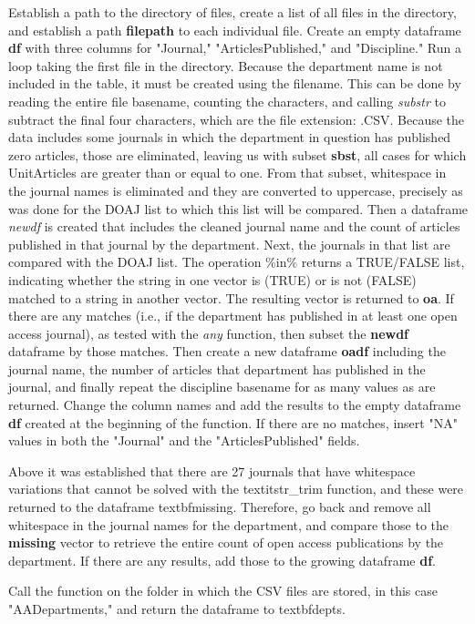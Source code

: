\documentclass{article}
\begin{document}
\footnotesize{
		Establish a path to the directory of files, create a list of all files in the directory, and establish a path \textbf{filepath} to each individual file.
		Create an empty dataframe \textbf{df} with three columns for "Journal," "ArticlesPublished," and "Discipline."
		Run a loop taking the first file in the directory.
		Because the department name is not included in the table, it must be created using the filename.
		This can be done by reading the entire file basename, counting the characters, and calling \textit{substr} to subtract the final four characters, which are the file extension: .CSV.
		Because the data includes some journals in which the department in question has published zero articles, those are eliminated, leaving us with subset \textbf{sbst}, all cases for which UnitArticles are greater than or equal to one.
		From that subset, whitespace in the journal names is eliminated and they are converted to uppercase, precisely as was done for the DOAJ list to which this list will be compared.
		Then a dataframe \textit{newdf} is created that includes the cleaned journal name and the count of articles published in that journal by the department.
		Next, the journals in that list are compared with the DOAJ list. 
		The operation \%in\%  returns a TRUE/FALSE list, indicating whether the string in one vector is (TRUE) or is not (FALSE) matched to a string in another vector. 
		The resulting vector is returned to \textbf{oa}.
		If there are any matches (i.e., if the department has published in at least one open access journal), as tested with the \textit{any} function, then subset the \textbf{newdf} dataframe by those matches.
		Then create a new dataframe \textbf{oadf} including the journal name, the number of articles that department has published in the journal, and finally repeat the discipline basename for as many values as are returned.
		Change the column names and add the results to the empty dataframe \textbf{df} created at the beginning of the function.
		If there are no matches, insert "NA" values in both the "Journal"  and the "ArticlesPublished" fields.
		
		Above it was established that there are 27 journals that have whitespace variations that cannot be solved with the textit{str\_trim} function, and these were returned to the dataframe textbf{missing}.
		Therefore, go back and remove all whitespace in the journal names for the department, and compare those to the \textbf{missing} vector to retrieve the entire count of open access publications by the department.
		If there are any results, add those to the growing dataframe \textbf{df}. 
		
		Call the function on the folder in which the CSV files are stored, in this case "AADepartments," and return the dataframe to textbf{depts}.
			}
\end{document}
